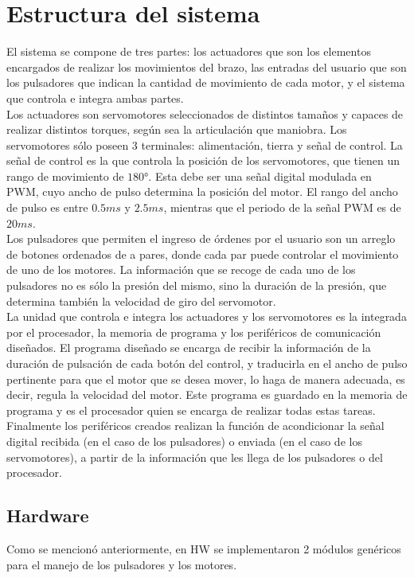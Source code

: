 \documentclass[twocolumn]{IEEEtran}
\begin{document}
\section{Estructura del sistema}
\noindent
El sistema se compone de tres partes: los actuadores que son los elementos encargados de realizar los movimientos del brazo, las entradas del usuario que son los pulsadores que indican la cantidad de movimiento de cada motor, y el sistema que controla e integra ambas partes.\\
Los actuadores son servomotores seleccionados de distintos tamaños y capaces de realizar distintos torques, según sea la articulación que maniobra. Los servomotores sólo poseen 3 terminales: alimentación, tierra y señal de control. La señal de control es la que controla la posición de los servomotores, que tienen un rango de movimiento de $180°$. Esta debe ser una señal digital modulada en PWM, cuyo ancho de pulso determina la posición del motor. El rango del ancho de pulso es entre $0.5ms$ y $2.5ms$, mientras que el periodo de la señal PWM es de $20ms$.\\
Los pulsadores que permiten el ingreso de órdenes por el usuario son un arreglo de botones ordenados de a pares, donde cada par puede controlar el movimiento de uno de los motores. La información que se recoge de cada uno de los pulsadores no es sólo la presión del mismo, sino la duración de la presión, que determina también la velocidad de giro del servomotor.\\
La unidad que controla e integra los actuadores y los servomotores es la integrada por el procesador, la memoria de programa y los periféricos de comunicación diseñados. El programa diseñado se encarga de recibir la información de la duración de pulsación de cada botón del control, y traducirla en el ancho de pulso pertinente para que el motor que se desea mover, lo haga de manera adecuada, es decir, regula la velocidad del motor. Este programa es guardado en la memoria de programa y es el procesador quien se encarga de realizar todas estas tareas. Finalmente los periféricos creados realizan la función de acondicionar la señal digital recibida (en el caso de los pulsadores) o enviada (en el caso de los servomotores), a partir de la información que les llega de los pulsadores o del procesador.

\subsection{Hardware}
\noindent
Como se mencionó anteriormente, en HW se implementaron 2 módulos genéricos para el manejo de los pulsadores y los motores.
\end{document}
